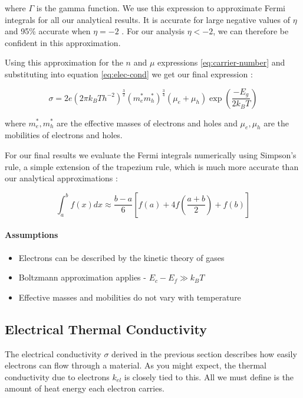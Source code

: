 \documentclass[12pt]{article}
\begin{document}
where $\Gamma$ is the gamma function. We use this expression to approximate Fermi integrals for all our analytical results. It is accurate for large negative values of $\eta$ and 95\% accurate when $\eta = -2$ \cite{drabble}. For our analysis $\eta < -2$, we can therefore be confident in this approximation.

Using this approximation for the $n$ and $\mu$ expressions \eqref{eq:carrier-number} and substituting into equation \eqref{eq:elec-cond} we get our final expression \cite{drabble}:

\begin{equation}
\label{eq:electrical-conductivity}
	\sigma = 2e (2\pi k_B T h^{-2})^\frac{3}{2} (m_e^* m_h^*)^\frac{3}{4} (\mu_e + \mu_h) \exp \left(\frac{-E_g}{2k_B T}\right)
\end{equation}

where $m_e^*, m_h^*$ are the effective masses of electrons and holes and $\mu_e, \mu_h$ are the mobilities of electrons and holes.

For our final results we evaluate the Fermi integrals numerically using Simpson's rule, a simple extension of the trapezium rule, which is much more accurate than our analytical approximations \cite{drabble}:

\begin{equation}
\label{eq:simpsons-rule}
	\int_a^b f(x) dx \approx \frac{b-a}{6} \left[f(a) +4f\left(\frac{a+b}{2}\right) + f(b)\right]
\end{equation}

\paragraph{Assumptions}
\begin{itemize}
  \item Electrons can be described by the kinetic theory of gases
  \item Boltzmann approximation applies - $E_c - E_f \gg k_B T$
  \item Effective masses and mobilities do not vary with temperature
\end{itemize}

\subsection{Electrical Thermal Conductivity}
\label{sec:electrical-thermal}
The electrical conductivity $\sigma$ derived in the previous section describes how easily electrons can flow through a material. As you might expect, the thermal conductivity due to electrons $k_{el}$ is closely tied to this. All we must define is the amount of heat energy each electron carries.
\end{document}
